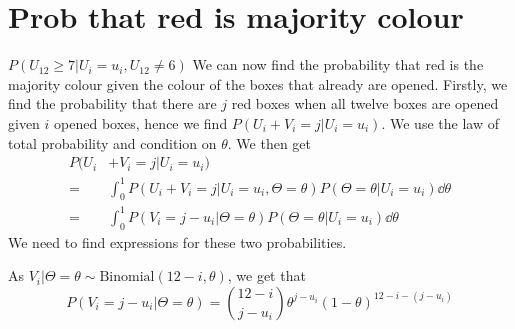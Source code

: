 \section{Prob that red is majority colour}
$P(U_{12}\geq 7|U_i=u_i,U_{12}\neq6)$
We can now find the probability that red is the majority colour given the colour of the boxes that already are opened. Firstly, we find the probability that there are $j$ red boxes when all twelve boxes are opened given $i$ opened boxes, hence we find $P(U_i+V_i = j | U_i=u_i)$.
We use the law of total probability and condition on $\theta$. We then get
\begin{equation} 
\label{prob_red_major}
    \begin{aligned}
        P(U_i&+V_i = j | U_i=u_i) \\[6pt]
        =& \int_0^1 P(U_i+V_i = j | U_i=u_i, \Theta=\theta) P(\Theta=\theta| U_i=u_i) \dd \theta \\[6pt]
        =& \int_0^1 P(V_i = j-u_i | \Theta=\theta) P(\Theta=\theta| U_i=u_i) \dd \theta
    \end{aligned}
\end{equation}
We need to find expressions for these two probabilities. 

As $V_i|\Theta=\theta \sim \text{Binomial}(12-i,\theta)$, we get that 
\begin{equation*}
    P(V_i=j-u_i|\Theta=\theta)=\binom{12-i}{j-u_i}\theta^{j-u_i}(1-\theta)^{12-i-(j-u_i)}
\end{equation*}


